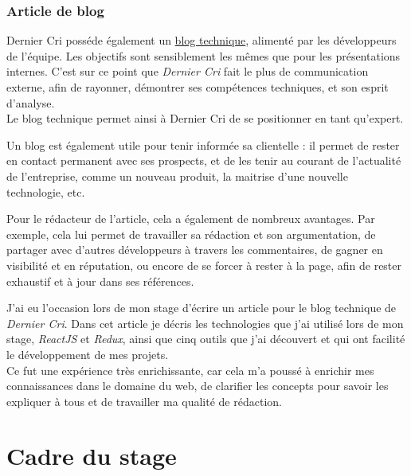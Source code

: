 \documentclass[12pt,a4paper]{article}
\begin{document}
  \bigskip

  \subsubsection{Article de blog}\label{article-de-blog}

  \bigskip

  Dernier Cri posséde également un
  \href{http://derniercri.io/tech-blog}{blog technique}, alimenté par les
  développeurs de l'équipe. Les objectifs sont sensiblement les mêmes que
  pour les présentations internes. C'est sur ce point que \emph{Dernier
  Cri} fait le plus de communication externe, afin de rayonner, démontrer
  ses compétences techniques, et son esprit d'analyse.\\
  Le blog technique permet ainsi à Dernier Cri de se positionner en tant
  qu'expert.

  \bigskip

  Un blog est également utile pour tenir informée sa clientelle : il
  permet de rester en contact permanent avec ses prospects, et de les
  tenir au courant de l'actualité de l'entreprise, comme un nouveau
  produit, la maitrise d'une nouvelle technologie, etc.

  \bigskip

  Pour le rédacteur de l'article, cela a également de nombreux avantages.
  Par exemple, cela lui permet de travailler sa rédaction et son
  argumentation, de partager avec d'autres développeurs à travers les
  commentaires, de gagner en visibilité et en réputation, ou encore de se
  forcer à rester à la page, afin de rester exhaustif et à jour dans ses
  références.

  \bigskip

  J'ai eu l'occasion lors de mon stage d'écrire un article pour le blog
  technique de \emph{Dernier Cri}. Dans cet article je décris les
  technologies que j'ai utilisé lors de mon stage, \emph{ReactJS} et
  \emph{Redux}, ainsi que cinq outils que j'ai découvert et qui ont
  facilité le développement de mes projets.\\
  Ce fut une expérience très enrichissante, car cela m'a poussé à enrichir
  mes connaissances dans le domaine du web, de clarifier les concepts pour
  savoir les expliquer à tous et de travailler ma qualité de rédaction.

  \newpage

  \section{Cadre du stage}\label{cadre-du-stage}
\end{document}
